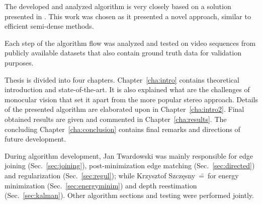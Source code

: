 The developed and analyzed algorithm is very closely based on a solution presented in \cite{jose2015realtime}. This work was chosen as it presented a novel approach, similar to efficient semi-dense methods.

Each step of the algorithm flow was analyzed and tested on video sequences from publicly available datasets that also contain ground truth data for validation purposes.

Thesis is divided into four chapters. Chapter~\ref{cha:intro} contains theoretical introduction and state-of-the-art. It is also explained what are the challenges of monocular vision that set it apart from the more popular stereo approach. Details of the presented algorithm are elaborated upon in Chapter~\ref{cha:intro2}. Final obtained results are given and commented in Chapter~\ref{cha:results}. The concluding Chapter~\ref{cha:conclusion} contains final remarks and directions of future development.

During algorithm development, Jan Twardowski was mainly responsible for edge joining (Sec.~\ref{sec:joining}), post-minimization edge matching (Sec.~\ref{sec:directed}) and regularization (Sec.~\ref{sec:regul}); while Krzysztof Szcz\k{e}sny~\==~for energy minimization (Sec.~\ref{sec:energyminim}) and depth reestimation (Sec.~\ref{sec:kalman}). Other algorithm sections and testing were performed jointly. 














\clearpage 
